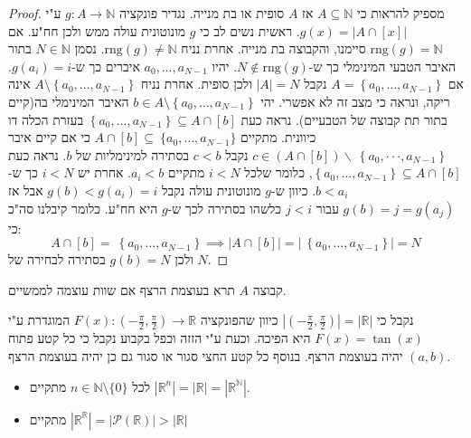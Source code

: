\documentclass{tstextbook}
\begin{document}
\begin{proof}
מספיק להראות כי \(A\subseteq \mathbb{N}\) אז \(A\) סופית או בת מנייה. נגדיר פונקציה \(g:A\to \mathbb{N}\) ע"י \(g(x)=|A\cap [x]|\). 
ראשית נשים לב כי \(g\) מונוטונית עולה ממש ולכן חח"ע. אם \(\mathrm{rng}(g)=\mathbb{N}\) סיימנו, והקבוצה בת מנייה. אחרת נניח \(\mathrm{rng}(g)\neq \mathbb{N}\). נסמן \(N \in \mathbb{N}\) בתור האיבר הטבעי המינימלי כך ש-\(N \notin \mathrm{rng}(g)\). יהיו \(a_{0},\dots,a_{N-1}\) איברים כך ש-\(g(a_{i})=i\). אם \(A=\left\{  a_{0},\dots,a_{N-1}  \right\}\) נקבל \(|A|=N\) ולכן סופית. אחרת נניח \(A \setminus \left\{   a_{0},\dots, a_{N - 1}  \right\}\) אינה ריקה, ונראה כי מצב זה לא אפשרי. יהי \(b \in A \setminus \left\{   a_{0},\dots,a_{N-1}  \right\}\) האיבר המינימלי בה(קיים בתור תת קבוצה של הטבעיים). 
נראה כעת \(\left\{a_{0},\ldots,a_{N-1}\right\}\subseteq A\cap[b]\) בעזרת הכלה דו כיוונית. מתקיים \(A\cap[b]\subseteq\ \{a_{0},\ldots,a_{N-1}\}\) כי אם קיים איבר \(c\in\left(A\cap[b]\right)\smallsetminus\ \left\{a_{0},\cdot\cdot\cdot,a_{N-1}\right\}\) נקבל \(c< b\) בסתירה למינימליות של \(b\). נראה כעת \(\left\{a_{0},\ldots,a_{N-1}\right\}\subseteq A\cap[b]\), כלומר שלכל \(i<N\) מתקיים \(a_{i}< b\). אחרת יש \(i< N\) כך ש-\(b< a_{i}\). כיוון ש-\(g\) מונוטונית עולה נקבל \(g(b)< g(a_{i})=i\) אבל אז \(g(b)=j=g(a_{j})\) עבור \(j< i\) כלשהו בסתירה לכך ש-\(g\) היא חח"ע. כלומר קיבלנו סה"כ כי:
$$A\cap[b]=\ \left\{ a_{0},\ldots,a_{N-1} \right\} \implies |A\cap[b]|=|\ \left\{ a_{0},\dots,a_{N-1} \right\}|=N$$
ולכן \(g(b)=N\) בסתירה לבחירה של \(N\).

\end{proof}
\begin{definition}
קבוצה \(A\) תרא בעוצמת הרצף אם שוות עוצמה לממשיים. 

\end{definition}
\begin{example}
נקבל כי \(|\left( -\frac{\pi}{2},\frac{\pi}{2} \right)|=|\mathbb{R}|\) כיוון שהפונקציה \(F(x):\left( -\frac{\pi}{2},\frac{\pi}{2} \right)\to \mathbb{R}\) המוגדרת ע"י \(F(x)=\tan(x)\) היא הפיכה. וכעת ע"י הזזה וכפל בקבוע נקבל כי כל קטע פתוח \((a,b)\) יהיה בעוצמת הרצף. בנוסף כל קטע החצי סגור או סגור גם כן יהיה בעוצמת הרצף.

\end{example}
\begin{proposition}
  \begin{itemize}
    \item לכל \(n \in \mathbb{N}\setminus \{ 0 \}\) מתקיים \(\left\lvert  \mathbb{R}^n  \right\rvert=\left\lvert  \mathbb{R}  \right\rvert=\left\lvert  \mathbb{R}^\mathbb{N}  \right\rvert\). 
    \item מתקיים \(\left\lvert  \mathbb{R}^\mathbb{R}  \right\rvert=\left\lvert  \mathcal{P}\left( \mathbb{R} \right)  \right\rvert>\left\lvert  \mathbb{R}  \right\rvert\)
  \end{itemize}
\end{proposition}
\end{document}
